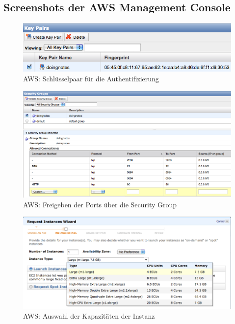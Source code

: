 \newpage
\subsection{Screenshots der AWS Management Console}
\label{subsec:aws}

\begin{figure}[H] 
  \begin{center}
    \includegraphics[width=\textwidth]{grafik/aws-key-pair} 
  \end{center}
  \caption{AWS: Schlüsselpaar für die Authentifizierung}
  \label{fig:aws-key}
\end{figure}

\begin{figure}[H] 
  \begin{center}
    \includegraphics[width=\textwidth]{grafik/aws-security-group} 
  \end{center}
  \caption{AWS: Freigeben der Ports über die Security Group}
  \label{fig:aws-group}
\end{figure}

\begin{figure}[H] 
  \begin{center}
    \includegraphics[width=\textwidth]{grafik/aws-select-size} 
  \end{center}
  \caption{AWS: Auswahl der Kapazitäten der Instanz}
  \label{fig:aws-size}
\end{figure}

